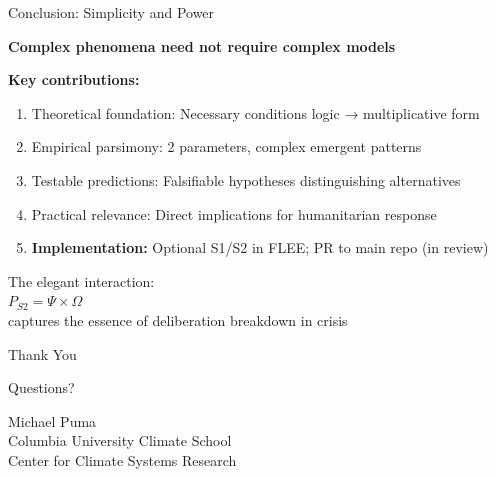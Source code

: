 \documentclass[aspectratio=169]{beamer}
\begin{document}
\begin{frame}{Conclusion: Simplicity and Power}

\begin{center}
\Large
\textbf{Complex phenomena need not require complex models}
\end{center}

\vspace{1em}

\textbf{Key contributions:}
\begin{enumerate}
    \item Theoretical foundation: Necessary conditions logic → multiplicative form
    \item Empirical parsimony: 2 parameters, complex emergent patterns
    \item Testable predictions: Falsifiable hypotheses distinguishing alternatives
    \item Practical relevance: Direct implications for humanitarian response
    \item \textbf{Implementation:} Optional S1/S2 in FLEE; PR to main repo (in review)
\end{enumerate}

\vspace{1em}

\begin{center}
\large
The elegant interaction:\\
\vspace{0.3em}
$\boxed{P_{S2} = \Psi \times \Omega}$\\
\vspace{0.3em}
captures the essence of deliberation breakdown in crisis
\end{center}

\end{frame}

\begin{frame}
\begin{center}
\Huge Thank You

\vspace{1em}

\Large Questions?

\vspace{1.5em}

\normalsize
Michael Puma\\
Columbia University Climate School\\
Center for Climate Systems Research
\end{center}
\end{frame}
\end{document}
